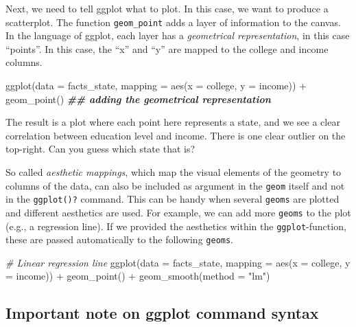 \documentclass[
]{article}
\newenvironment{Shaded}{\begin{snugshade}}{\end{snugshade}}
\newcommand{\AttributeTok}[1]{\textcolor[rgb]{0.77,0.63,0.00}{#1}}
\newcommand{\CommentTok}[1]{\textcolor[rgb]{0.56,0.35,0.01}{\textit{#1}}}
\newcommand{\DocumentationTok}[1]{\textcolor[rgb]{0.56,0.35,0.01}{\textbf{\textit{#1}}}}
\newcommand{\FunctionTok}[1]{\textcolor[rgb]{0.00,0.00,0.00}{#1}}
\newcommand{\NormalTok}[1]{#1}
\newcommand{\SpecialCharTok}[1]{\textcolor[rgb]{0.00,0.00,0.00}{#1}}
\newcommand{\StringTok}[1]{\textcolor[rgb]{0.31,0.60,0.02}{#1}}
\begin{document}
Next, we need to tell ggplot what to plot. In this case, we want to
produce a scatterplot. The function \texttt{geom\_point} adds a layer of
information to the canvas. In the language of ggplot, each layer has a
\emph{geometrical representation}, in this case ``points''. In this
case, the ``x'' and ``y'' are mapped to the college and income columns.

\begin{Shaded}
\begin{Highlighting}[]
\FunctionTok{ggplot}\NormalTok{(}\AttributeTok{data =}\NormalTok{ facts\_state,}
       \AttributeTok{mapping =} \FunctionTok{aes}\NormalTok{(}\AttributeTok{x =}\NormalTok{ college, }\AttributeTok{y =}\NormalTok{ income)) }\SpecialCharTok{+} 
  \FunctionTok{geom\_point}\NormalTok{()   }\DocumentationTok{\#\# adding the geometrical representation}
\end{Highlighting}
\end{Shaded}

The result is a plot where each point here represents a state, and we
see a clear correlation between education level and income. There is one
clear outlier on the top-right. Can you guess which state that is?

So called \emph{aesthetic mappings}, which map the visual elements of
the geometry to columns of the data, can also be included as argument in
the \texttt{geom} itself and not in the \texttt{ggplot()?} command. This
can be handy when several \texttt{geoms} are plotted and different
aesthetics are used. For example, we can add more \texttt{geoms} to the
plot (e.g., a regression line). If we provided the aesthetics within the
\texttt{ggplot}-function, these are passed automatically to the
following \texttt{geoms}.

\begin{Shaded}
\begin{Highlighting}[]
\CommentTok{\# Linear regression line}
\FunctionTok{ggplot}\NormalTok{(}\AttributeTok{data =}\NormalTok{ facts\_state, }
       \AttributeTok{mapping =} \FunctionTok{aes}\NormalTok{(}\AttributeTok{x =}\NormalTok{ college, }\AttributeTok{y =}\NormalTok{ income)) }\SpecialCharTok{+} 
  \FunctionTok{geom\_point}\NormalTok{() }\SpecialCharTok{+}
  \FunctionTok{geom\_smooth}\NormalTok{(}\AttributeTok{method =} \StringTok{"lm"}\NormalTok{)}
\end{Highlighting}
\end{Shaded}

\hypertarget{important-note-on-ggplot-command-syntax}{%
\subsection{Important note on ggplot command
syntax}\label{important-note-on-ggplot-command-syntax}}
\end{document}

